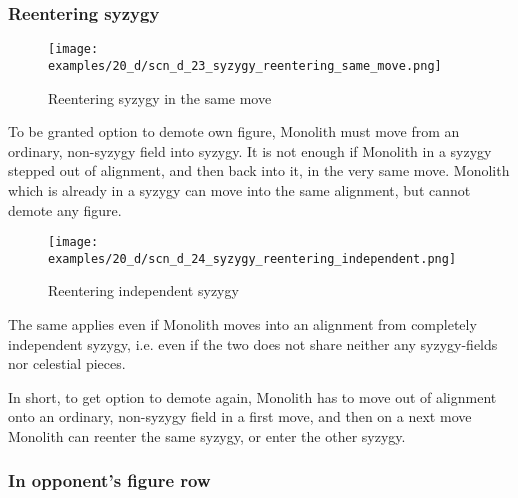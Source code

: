 \clearpage %

\subsubsection*{Reentering syzygy}

\vspace*{-1.2\baselineskip}
\noindent
\begin{figure}[!h]
\texttt{[image: examples/20\_d/scn\_d\_23\_syzygy\_reentering\_same\_move.png]}
\caption{Reentering syzygy in the same move}
\label{fig:scn_d_23_syzygy_reentering_same_move}
\end{figure}

To be granted option to demote own figure, Monolith must move from an ordinary, non-syzygy field into syzygy. It is
not enough if Monolith in a syzygy stepped out of alignment, and then back into it, in the very same move. Monolith
which is already in a syzygy can move into the same alignment, but cannot demote any figure.

\clearpage %

\noindent
\begin{figure}[!h]
\texttt{[image: examples/20\_d/scn\_d\_24\_syzygy\_reentering\_independent.png]}
\caption{Reentering independent syzygy}
\label{fig:scn_d_24_syzygy_reentering_independent}
\end{figure}

The same applies even if Monolith moves into an alignment from completely independent syzygy, i.e. even if the two does
not share neither any syzygy-fields nor celestial pieces.

In short, to get option to demote again, Monolith has to move out of alignment onto an ordinary, non-syzygy field in a
first move, and then on a next move Monolith can reenter the same syzygy, or enter the other syzygy.

\clearpage %

\subsubsection*{In opponent's figure row}


